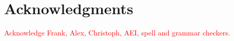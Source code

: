 \section{Acknowledgments}
\textcolor{red}{Acknowledge Frank, Alex, Christoph, AEI, spell and grammar checkers.}
